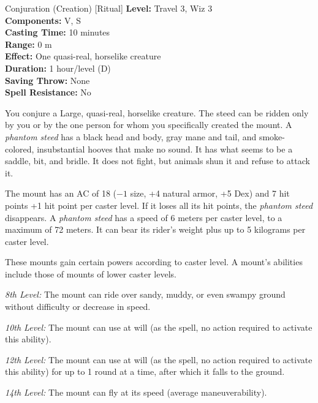 {Conjuration (Creation) [Ritual]}
{
	\textbf{Level:}
	Travel 3, Wiz 3\\
	\textbf{Components:}
	V, S\\
	\textbf{Casting Time:}
	10 minutes\\
	\textbf{Range:}
	0 m\\
	\textbf{Effect:}
	One quasi-real, horselike creature\\
	\textbf{Duration:}
	1 hour/level (D)\\
	\textbf{Saving Throw:}
	None\\
	\textbf{Spell Resistance:}
	No\\
}
{
	You conjure a Large, quasi-real, horselike creature. The steed can be ridden only by you or by the one person for whom you specifically created the mount. A \emph{phantom steed} has a black head and body, gray mane and tail, and smoke-colored, insubstantial hooves that make no sound. It has what seems to be a saddle, bit, and bridle. It does not fight, but animals shun it and refuse to attack it.

	The mount has an AC of 18 ($-1$ size, +4 natural armor, +5 Dex) and 7 hit points +1 hit point per caster level. If it loses all its hit points, the \emph{phantom steed} disappears. A \emph{phantom steed} has a speed of 6 meters per caster level, to a maximum of 72 meters. It can bear its rider's weight plus up to 5 kilograms per caster level.

	These mounts gain certain powers according to caster level. A mount's abilities include those of mounts of lower caster levels.

	\textit{8th Level:}
	The mount can ride over sandy, muddy, or even swampy ground without difficulty or decrease in speed.

	\textit{10th Level:}
	The mount can use  at will (as the spell, no action required to activate this ability).

	\textit{12th Level:}
	The mount can use  at will (as the spell, no action required to activate this ability) for up to 1 round at a time, after which it falls to the ground.

	\textit{14th Level:}
	The mount can fly at its speed (average maneuverability).

}
